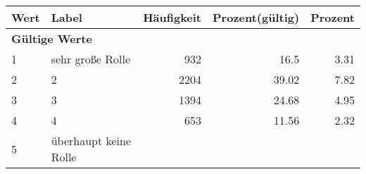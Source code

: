      \begin{longtable}{lXrrr}
     \toprule
     \textbf{Wert} & \textbf{Label} & \textbf{Häufigkeit} & \textbf{Prozent(gültig)} & \textbf{Prozent} \\
     \endhead
     \midrule
     \multicolumn{5}{l}{\textbf{Gültige Werte}}\\

     1 &
     \multicolumn{1}{X}{ sehr große Rolle   } &


       \num{932} &
       \num[round-mode=places,round-precision=2]{16,5} &
         \num[round-mode=places,round-precision=2]{3,31} \\

     2 &
     \multicolumn{1}{X}{ 2   } &


       \num{2204} &
       \num[round-mode=places,round-precision=2]{39,02} &
         \num[round-mode=places,round-precision=2]{7,82} \\

     3 &
     \multicolumn{1}{X}{ 3   } &


       \num{1394} &
       \num[round-mode=places,round-precision=2]{24,68} &
         \num[round-mode=places,round-precision=2]{4,95} \\

     4 &
     \multicolumn{1}{X}{ 4   } &


       \num{653} &
       \num[round-mode=places,round-precision=2]{11,56} &
         \num[round-mode=places,round-precision=2]{2,32} \\

     5 &
     \multicolumn{1}{X}{ überhaupt keine Rolle   } &



\end{longtable}
